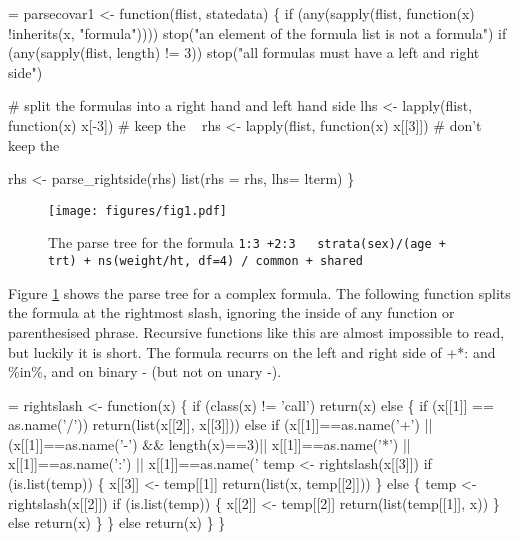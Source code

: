 \documentclass{article}
\newcommand{\code}[1]{\texttt{#1}}
\begin{document}
\begin{nwchunk}
=
 parsecovar1 <- function(flist, statedata) \{
     if (any(sapply(flist, function(x) !inherits(x, "formula"))))
         stop("an element of the formula list is not a formula")
     if (any(sapply(flist, length) != 3))
         stop("all formulas must have a left and right side")
     
     # split the formulas into a right hand and left hand side
     lhs <- lapply(flist, function(x) x[-3])   # keep the ~
     rhs <- lapply(flist, function(x) x[[3]])  # don't keep the ~
     
     rhs <- parse_rightside(rhs)
     list(rhs = rhs, lhs= lterm)
 \}
\end{nwchunk}

\begin{figure}
  \texttt{[image: figures/fig1.pdf]}
  \caption{The parse tree for the formula 
    \code{1:3 +2:3 ~ strata(sex)/(age + trt) + ns(weight/ht, df=4) / common + shared}}
  \label{figparse}
\end{figure}

Figure \ref{figparse} shows the parse tree for a complex formula.
The following function splits the formula at the rightmost slash, ignoring the
inside of any function or parenthesised phrase.
Recursive functions like this are almost impossible to read, but luckily 
it is short.
The formula recurrs on the left and right side of +*: and \%in\%, and on 
binary - (but not on unary -).
\begin{nwchunk}
=
 rightslash <- function(x) \{
     if (class(x) != 'call') return(x)
     else \{
         if (x[[1]] == as.name('/')) return(list(x[[2]], x[[3]]))
         else if (x[[1]]==as.name('+') || (x[[1]]==as.name('-') && length(x)==3)||
                  x[[1]]==as.name('*') || x[[1]]==as.name(':')  ||
                  x[[1]]==as.name('%
                      temp <- rightslash(x[[3]])
                      if (is.list(temp)) \{
                          x[[3]] <- temp[[1]]
                          return(list(x, temp[[2]]))
                      \} else \{
                          temp <- rightslash(x[[2]])
                          if (is.list(temp)) \{
                              x[[2]] <- temp[[2]]
                              return(list(temp[[1]], x))
                          \} else return(x)
                      \}
                  \}
         else return(x)
     \}
 \}
\end{nwchunk}
\end{document}
